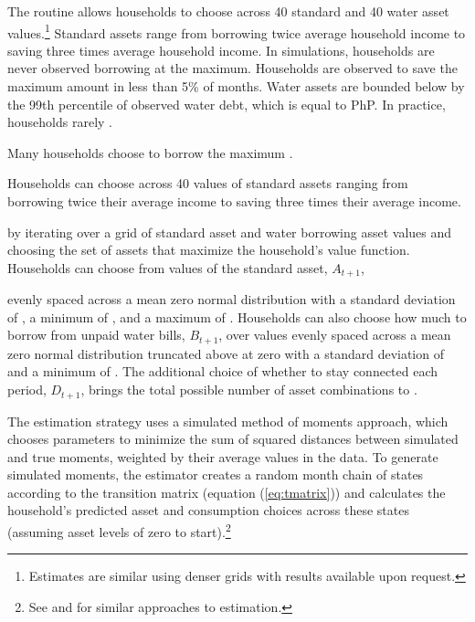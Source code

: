 \documentclass[12pt]{article}
\begin{document}
The routine allows households to choose across 40 standard and 40 water asset values.\footnote{Estimates are similar using denser grids with results available upon request.}  Standard assets range from borrowing twice average household income to saving three times average household income.  In simulations, households are never observed borrowing at the maximum.  Households are observed to save the maximum amount in less than 5\% of months.  Water assets are bounded below by the 99th percentile of observed water debt, which is equal to PhP.  In practice, households rarely  .  

Many households choose to borrow the maximum .

Households can choose across 40 values of standard assets ranging from borrowing twice their average income to saving three times their average income.


 by iterating over a grid of standard asset and water borrowing asset values and choosing the set of assets that maximize the household's value function.  Households can choose from values of the standard asset, $A_{t+1}$, 

evenly spaced across a mean zero normal distribution with a standard deviation of \unskip, a minimum of \unskip, and a maximum of \unskip.  Households can also choose how much to borrow from unpaid water bills, $B_{t+1}$, over values evenly spaced across a mean zero normal distribution truncated above at zero with a standard deviation of and a minimum of \unskip.  The additional choice of whether to stay connected each period, $D_{t+1}$, brings the total possible number of asset combinations to \unskip.

The estimation strategy uses a simulated method of moments approach, which chooses parameters to minimize the sum of squared distances between simulated and true moments, weighted by their average values in the data.  To generate simulated moments, the estimator creates a random month chain of states according to the transition matrix (equation (\ref{eq:tmatrix})) and calculates the household's predicted asset and consumption choices across these states (assuming asset levels of zero to start).\footnote{See \cite{laibson2007estimating} and \cite{gourinchas2002consumption} for similar approaches to estimation.}
\end{document}
